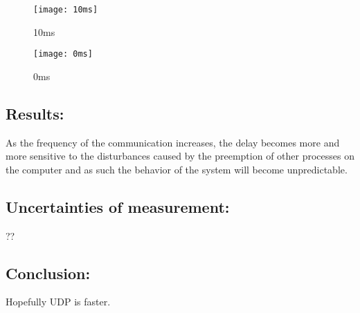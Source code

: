 \begin{figure}[H]

    \centering

    \texttt{[image: 10ms]}

    \caption{10ms}

\end{figure} 

\begin{figure}[H]

    \centering

    \texttt{[image: 0ms]}

    \caption{0ms}

\end{figure} 




\subsection*{Results:}

As the frequency of the communication increases, the delay becomes more and more sensitive to the disturbances caused by the preemption of other processes on the computer and as such the behavior of the system will become unpredictable. 


\subsection*{Uncertainties of measurement:}

??

\subsection*{Conclusion:}

Hopefully UDP is faster.